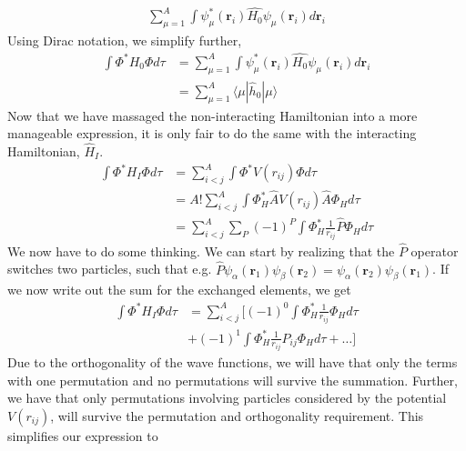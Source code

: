 \documentclass[11pt]{article}
\begin{document}
\begin{align*}
	\sum^A_{\mu=1} \int \psi^*_\mu(\mathbf{r}_i) \hat{H_0} \psi_\mu(\mathbf{r}_i) d\mathbf{r}_i
\end{align*}
Using Dirac notation, we simplify further, 
\begin{align}
	\int \Phi^* H_0 \Phi d\tau &= \sum^A_{\mu=1} \int \psi^*_\mu(\mathbf{r}_i) \hat{H_0} \psi_\mu(\mathbf{r}_i) d\mathbf{r}_i \nonumber \\
	&= \sum^A_{\mu=1} \langle \mu |\hat{h}_0|\mu\rangle
	\label{eq:non-interaction-hamilton}
\end{align}
Now that we have massaged the non-interacting Hamiltonian into a more manageable expression, it is only fair to do the same with the interacting Hamiltonian, $\hat{H}_I$.
\begin{align*}
	\int \Phi^* H_I \Phi d\tau &= \sum^A_{i<j} \int \Phi^* V(r_{ij}) \Phi d\tau \\
	&= A! \sum^A_{i<j} \int \Phi_H^* \hat{A} V(r_{ij}) \hat{A} \Phi_H d\tau \\
	&= \sum^A_{i<j} \sum_P (-1)^P \int \Phi_H^* \frac{1}{r_{ij}} \hat{P} \Phi_H d\tau
\end{align*}
We now have to do some thinking. We can start by realizing that the $\hat{P}$ operator switches two particles, such that e.g. $\hat{P}\psi_\alpha(\mathbf{r}_1)\psi_\beta(\mathbf{r}_2) = \psi_\alpha(\mathbf{r}_2)\psi_\beta(\mathbf{r}_1)$. If we now write out the sum for the exchanged elements, we get
\begin{align*}
	\int \Phi^* H_I \Phi d\tau &= \sum^A_{i<j} \bigg[ (-1)^0 \int \Phi_H^* \frac{1}{r_{ij}} \Phi_H d\tau \\ 
	&+ (-1)^1 \int \Phi_H^* \frac{1}{r_{ij}} P_{ij} \Phi_H d\tau + \dots \bigg]
\end{align*}
Due to the orthogonality of the wave functions, we will have that only the terms with one permutation and no permutations will survive the summation. Further, we have that only permutations involving particles considered by the potential $V(r_{ij})$, will survive the permutation and orthogonality requirement. This simplifies our expression to
\end{document}
